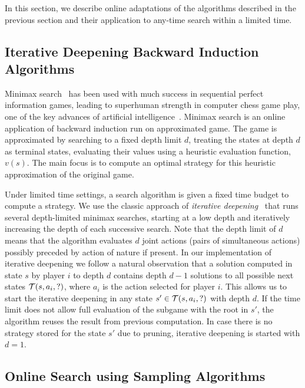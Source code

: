 In this section, we describe online adaptations of the algorithms described in the previous section and their application
to any-time search within a limited time.

\subsection{Iterative Deepening Backward Induction Algorithms} \label{sec:idbi}

Minimax search~\cite{AIbook} has been used with much success in sequential perfect information games,
leading to superhuman strength in computer chess game play, one of the key advances of artificial
intelligence~\cite{Campbell02deepblue}.
Minimax search is an online application of backward induction run on approximated game.
The game is approximated by searching to a fixed depth limit $d$, treating the states at depth $d$
as terminal states, evaluating their values using a heuristic evaluation function, $v(s)$.
The main focus is to compute an optimal strategy for this heuristic approximation of the original game.

Under limited time settings, a search algorithm is given a fixed time budget to compute a strategy.
We use the classic approach of {\it iterative deepening}~\cite{AIbook} that runs several depth-limited
minimax searches, starting at a low depth and iteratively increasing the depth of each successive search.
Note that the depth limit of $d$ means that the algorithm evaluates $d$ joint actions (\ie pairs of simultaneous actions) possibly preceded by action of nature if present.
In our implementation of iterative deepening we follow a natural observation that a solution computed in state $s$ by player $i$ to depth $d$ contains depth $d-1$ solutions to all possible next states $\mathcal{T}(s,a_i,?)$, where $a_i$ is the action selected for player $i$.
This allows us to start the iterative deepening in any state $s' \in \mathcal{T}(s,a_i,?)$ with depth $d$.
If the time limit does not allow full evaluation of the subgame with the root in $s'$, the algorithm reuses the result from previous computation.
In case there is no strategy stored for the state $s'$ due to pruning, iterative deepening is started with $d = 1$.

\subsection{Online Search using Sampling Algorithms}


